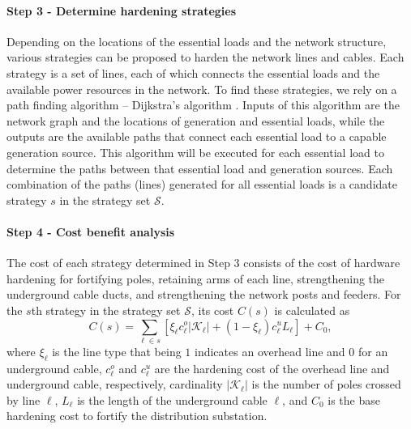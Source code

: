 \documentclass[conference]{IEEEtran}
\begin{document}
\paragraph{Step 3 - Determine hardening strategies}\label{p2s3}
Depending on the locations of the essential loads and the network structure, various strategies can be proposed to harden the network lines and cables. Each strategy is a set of lines, each of which connects the essential loads and the available power resources in the network. To find these strategies, we rely on a path finding algorithm -- Dijkstra’s algorithm \cite{PENG_djikestra_2012}. Inputs of this algorithm are the network graph and the locations of generation and essential loads, while the outputs are the available paths that connect each essential load to a capable generation source. This algorithm will be executed for each essential load to determine the paths between that essential load and generation sources. Each combination of the paths (lines) generated for all essential loads is a candidate strategy $s$ in the strategy set $\mathcal{S}$.
\paragraph{Step 4 - Cost benefit analysis}\label{p2s4}
The cost of each strategy determined in Step 3 consists of the cost of hardware hardening for fortifying poles, retaining arms of each line, strengthening the underground cable ducts, and strengthening the network posts and feeders. For the $s$th strategy in the strategy set $\mathcal{S}$, its cost $C(s)$ is calculated as
\begin{equation} \label{cost}
    C(s)=\sum_{\ell\in s}\left[\xi_\ell c_{\ell}^o |\mathcal{K}_\ell| +(1-\xi_\ell ) c_{\ell}^u  L_\ell \right]+C_0,
\end{equation}
where $\xi_\ell$ is the line type that being $1$ indicates an overhead line and 0 for an underground cable, $c_{\ell}^o$ and $c_{\ell}^u$ are the hardening cost of the overhead line and underground cable, respectively, cardinality $|\mathcal{K}_\ell|$ is the number of poles crossed by line $\ell$, $L_\ell$ is the length of the underground cable $\ell$, and $C_0$ is the base hardening cost to fortify the distribution substation.
\end{document}
